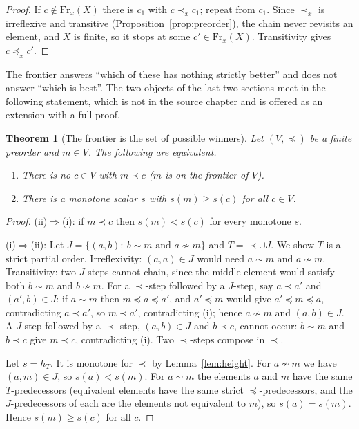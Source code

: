 \documentclass[11pt]{article}
\theoremstyle{plain}
\newtheorem{theorem}{Theorem}
\theoremstyle{definition}
\theoremstyle{remark}
\newcommand{\Fr}{\mathrm{Fr}}
\begin{document}
\begin{proof}
If $c\notin\Fr_x(X)$ there is $c_1$ with $c\prec_x c_1$; repeat from $c_1$. Since $\prec_x$ is irreflexive and transitive (Proposition~\ref{prop:preorder}), the chain never revisits an element, and $X$ is finite, so it stops at some $c'\in\Fr_x(X)$. Transitivity gives $c\preceq_x c'$.
\end{proof}

The frontier answers ``which of these has nothing strictly better'' and does not answer ``which is best''. The two objects of the last two sections meet in the following statement, which is not in the source chapter and is offered as an extension with a full proof.

\begin{theorem}[The frontier is the set of possible winners]\label{thm:winners}
Let $(V,\preceq)$ be a finite preorder and $m\in V$. The following are equivalent.
\begin{enumerate}[label=(\roman*)]
\item There is no $c\in V$ with $m\prec c$ ($m$ is on the frontier of $V$).
\item There is a monotone scalar $s$ with $s(m)\ge s(c)$ for all $c\in V$.
\end{enumerate}
\end{theorem}

\begin{proof}
(ii)$\Rightarrow$(i): if $m\prec c$ then $s(m)<s(c)$ for every monotone $s$.

(i)$\Rightarrow$(ii): Let $J=\{(a,b):\ b\sim m\text{ and }a\not\sim m\}$ and $T={\prec}\cup J$. We show $T$ is a strict partial order. Irreflexivity: $(a,a)\in J$ would need $a\sim m$ and $a\not\sim m$. Transitivity: two $J$-steps cannot chain, since the middle element would satisfy both $b\sim m$ and $b\not\sim m$. For a $\prec$-step followed by a $J$-step, say $a\prec a'$ and $(a',b)\in J$: if $a\sim m$ then $m\preceq a\preceq a'$, and $a'\preceq m$ would give $a'\preceq m\preceq a$, contradicting $a\prec a'$, so $m\prec a'$, contradicting (i); hence $a\not\sim m$ and $(a,b)\in J$. A $J$-step followed by a $\prec$-step, $(a,b)\in J$ and $b\prec c$, cannot occur: $b\sim m$ and $b\prec c$ give $m\prec c$, contradicting (i). Two $\prec$-steps compose in $\prec$.

Let $s=h_T$. It is monotone for $\prec$ by Lemma~\ref{lem:height}. For $a\not\sim m$ we have $(a,m)\in J$, so $s(a)<s(m)$. For $a\sim m$ the elements $a$ and $m$ have the same $T$-predecessors (equivalent elements have the same strict $\preceq$-predecessors, and the $J$-predecessors of each are the elements not equivalent to $m$), so $s(a)=s(m)$. Hence $s(m)\ge s(c)$ for all $c$.
\end{proof}
\end{document}
